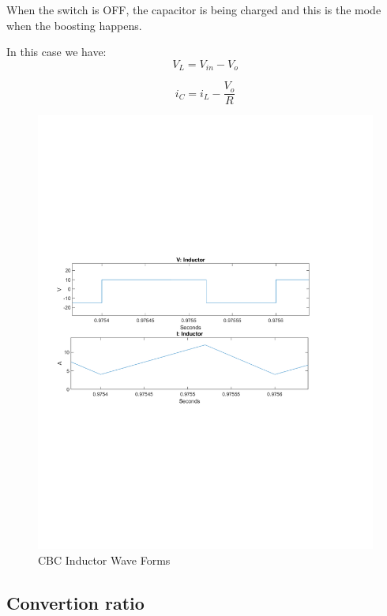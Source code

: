 When the switch is OFF,
the capacitor is being charged and this is the mode when the boosting happens.

In this case we have:
\begin{equation}
	V_L = V_{in} - V_o
	\label{eq:CBC_SWOFF1}
\end{equation}

\begin{equation}
	i_C = i_L -\frac{V_o}{R}
	\label{eq:CBC_SWOFF2}
\end{equation}

\begin{figure}[H]
   \centering
   \includegraphics[width=\textwidth]{figures/aConventionalBoost/LvAndLi.pdf}
    \caption{CBC Inductor Wave Forms}
	\label{fig:ConventionalBoostOFF}
\end{figure}

\subsection{Convertion ratio}\label{sec:convertionRatio}

